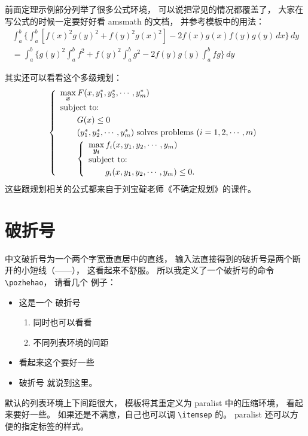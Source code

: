 前面定理示例部分列举了很多公式环境，
可以说把常见的情况都覆盖了，
大家在写公式的时候一定要好好看 \textsf{amsmath} 的文档，
并参考模板中的用法：
\begin{multline*}%
\int_a^b\biggl\{\int_a^b[f(x)^2g(y)^2+f(y)^2g(x)^2]
 -2f(x)g(x)f(y)g(y)\,dx\biggr\}\,dy \\
 =\int_a^b\biggl\{g(y)^2\int_a^bf^2+f(y)^2
  \int_a^b g^2-2f(y)g(y)\int_a^b fg\biggr\}\,dy
\end{multline*}

其实还可以看看这个多级规划：
\begin{equation}\label{bilevel}
\left\{\begin{array}{l}
\max\limits_{{\mbox{\footnotesize\boldmath $x$}}} F(x,y_1^*,y_2^*,\cdots,y_m^*)\\[0.2cm]
\mbox{subject to:}\\[0.1cm]
\qquad G(x)\le 0\\[0.1cm]
\qquad(y_1^*,y_2^*,\cdots,y_m^*)\mbox{ solves problems }(i=1,2,\cdots,m)\\[0.1cm]
\qquad\left\{\begin{array}{l}
    \max\limits_{{\mbox{\footnotesize\boldmath $y_i$}}}f_i(x,y_1,y_2,\cdots,y_m)\\[0.2cm]
    \mbox{subject to:}\\[0.1cm]
    \qquad g_i(x,y_1,y_2,\cdots,y_m)\le 0.
    \end{array}\right.
\end{array}\right.
\end{equation}
这些跟规划相关的公式都来自于刘宝碇老师《不确定规划》的课件。

\section{破折号}
\label{sec:pozhehao}

中文破折号为一个两个字宽垂直居中的直线，
输入法直接得到的破折号是两个断开的小短线（——），
这看起来不舒服。
所以我定义了一个破折号的命令 \verb|\pozhehao|，
请看几个
例子：
\begin{itemize}
\item 这是一个 \pozhehao 破折号
  \begin{enumerate}%
  \item 同时也可以看看
  \item 不同列表环境的间距
  \end{enumerate}
\item 看起来这个要好一些
\item 破折号 \pozhehao 就说到这里。
\end{itemize}

默认的列表环境上下间距很大，
模板将其重定义为 \textsf{paralist} 中的压缩环境，
看起来要好一些。
如果还是不满意，自己也可以调 \verb|\itemsep| 的。
\textsf{paralist} 还可以方便的指定标签的样式。

